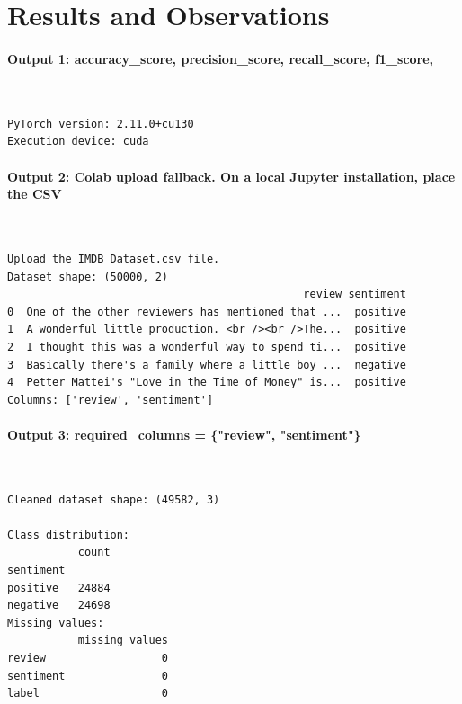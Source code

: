 \documentclass[12pt,a4paper,oneside]{report}
\begin{document}
\section{Results and Observations}
\paragraph{Output 1: accuracy\_score, precision\_score, recall\_score, f1\_score,}\mbox{}\\[-1ex]
\begin{Verbatim}[commandchars=\\\{\},breaklines=true,breakanywhere=true,fontsize=\scriptsize,frame=leftline,framesep=2mm,rulecolor=\color{gray}]
PyTorch version: 2.11.0+cu130
Execution device: cuda
\end{Verbatim}
\paragraph{Output 2: Colab upload fallback. On a local Jupyter installation, place the CSV}\mbox{}\\[-1ex]
\begin{Verbatim}[commandchars=\\\{\},breaklines=true,breakanywhere=true,fontsize=\scriptsize,frame=leftline,framesep=2mm,rulecolor=\color{gray}]
Upload the IMDB Dataset.csv file.
Dataset shape: (50000, 2)
                                              review sentiment
0  One of the other reviewers has mentioned that ...  positive
1  A wonderful little production. <br /><br />The...  positive
2  I thought this was a wonderful way to spend ti...  positive
3  Basically there's a family where a little boy ...  negative
4  Petter Mattei's "Love in the Time of Money" is...  positive
Columns: ['review', 'sentiment']
\end{Verbatim}
\paragraph{Output 3: required\_columns = \{"review", "sentiment"\}}\mbox{}\\[-1ex]
\begin{Verbatim}[commandchars=\\\{\},breaklines=true,breakanywhere=true,fontsize=\scriptsize,frame=leftline,framesep=2mm,rulecolor=\color{gray}]
Cleaned dataset shape: (49582, 3)

Class distribution:
           count
sentiment
positive   24884
negative   24698
Missing values:
           missing values
review                  0
sentiment               0
label                   0
\end{Verbatim}
\end{document}
